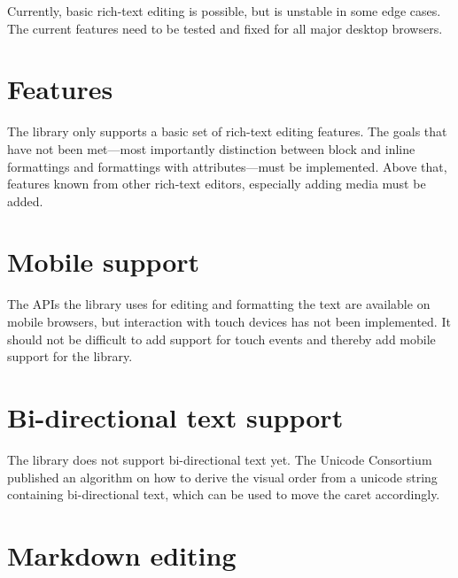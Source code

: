 Currently, basic rich-text editing is possible, but is unstable in some edge cases. The current features need to be tested and fixed for all major desktop browsers.

\section{Features}

The library only supports a basic set of rich-text editing features. The goals that have not been met---most importantly distinction between block and inline formattings and formattings with attributes---must be implemented. Above that, features known from other rich-text editors, especially adding media must be added.



\section{Mobile support}

The APIs the library uses for editing and formatting the text are available on mobile browsers, but interaction with touch devices has not been implemented. It should not be difficult to add support for touch events and thereby add mobile support for the library.

\section{Bi-directional text support}

The library does not support bi-directional text yet. The Unicode Consortium published an algorithm \cite{UBA} on how to derive the visual order from a unicode string containing bi-directional text, which can be used to move the caret accordingly.

\section{Markdown editing}

